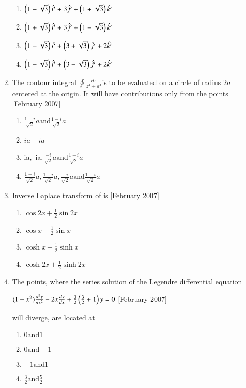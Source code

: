 \documentclass[journal]{IEEEtran}
\begin{document}
\begin{enumerate}
\begin{enumerate}
\item $\left(1-\sqrt{3}\right)\hat{i'} + 3\hat{j'} + \left(1+\sqrt{3}\right)\hat{k'}$
\item $\left(1+\sqrt{3}\right)\hat{i'} + 3\hat{j'} + \left(1-\sqrt{3}\right)\hat{k'}$
\item $\left(1-\sqrt{3}\right)\hat{i'} + \left(3+\sqrt{3}\right)\hat{j'} + 2\hat{k'}$
\item $\left(1-\sqrt{3}\right)\hat{i'} + \left(3-\sqrt{3}\right)\hat{j'} + 2\hat{k'}$
\end{enumerate}
\item The contour integral  $\oint \frac{dz}{z^4 + a^4}$is to be evaluated on a circle of radius $2a$ centered at the origin. It will have contributions only from the points \hfill[February 2007]
\begin{enumerate}
\item $ \frac{1+i}{\sqrt{2}}a  \text{and}  \frac{1-i}{\sqrt{2}}a$

\item   $ia$    $-ia$
\item $  $ia$,  $-ia$,  \frac{-i}{\sqrt{2}}a \text{and}  \frac{1-i}{\sqrt{2}}a$
\item $  \frac{1+i}{\sqrt{2}}a,  \frac{1-i}{\sqrt{2}}a,  \frac{-i}{\sqrt{2}}a  \text{and}  \frac{1-i}{\sqrt{2}}a$
\end{enumerate}
\item Inverse Laplace transform of  is \hfill[February 2007]
\begin{enumerate}
\item $ \cos 2x + \frac{1}{2}\sin 2x$
\item $ \cos x + \frac{1}{2}\sin x$

\item $\cosh x + \frac{1}{2}\sinh x$
\item $ \cosh 2x + \frac{1}{2}\sinh 2x$
\end{enumerate}
\item The points, where the series solution of the Legendre differential equation

$(1 - x^2)\frac{d^2 y}{dx^2} - 2x\frac{dy}{dx} + \frac{3}{2}\left(\frac{3}{2}+1\right)y = 0 $ \hfill[February 2007]

will diverge, are located at
\begin{enumerate}
\item $  0 \text{and}  1$
\item $  0 \text{and} -1$
\item $ -1 \text{and}  1$
\item $ \frac{3}{2}  \text{and} \frac{5}{2} $
\end{enumerate}


\end{enumerate}
\end{document}
